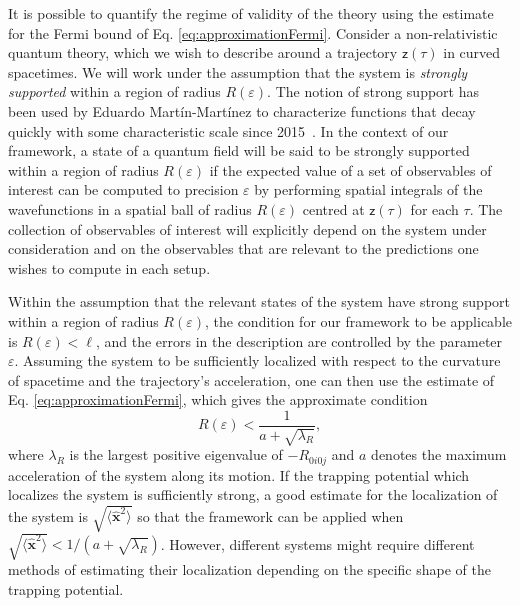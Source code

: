 \documentclass[letterpaper,12pt,titlepage,oneside,final]{book}
\newcommand{\mf}{\mathsf}%
\begin{document}
It is possible to quantify the regime of validity of the theory using the estimate for the Fermi bound of Eq. \eqref{eq:approximationFermi}. Consider a non-relativistic quantum theory, which we wish to describe around a trajectory $\mf z(\tau)$ in curved spacetimes. We will work under the assumption that the system is \emph{strongly supported} within a region of radius $R(\varepsilon)$. The notion of strong support has been used by Eduardo Mart\'in-Mart\'inez to characterize functions that decay quickly with some characteristic scale since 2015~\cite{Pozas-Kerstjens:2015}. In the context of our framework, a state of a quantum field will be said to be strongly supported within a region of radius $R(\varepsilon)$ if the expected value of a set of observables of interest can be computed to precision $\varepsilon$ by performing spatial integrals of the wavefunctions in a spatial ball of radius $R(\varepsilon)$ centred at $\mf z(\tau)$ for each $\tau$. The collection of observables of interest will explicitly depend on the system under consideration and on the observables that are relevant to the predictions one wishes to compute in each setup.

Within the assumption that the relevant states of the system have strong support within a region of radius $R(\varepsilon)$, the condition for our framework to be applicable is $R(\varepsilon)<\ell$, and the errors in the description are controlled by the parameter $\varepsilon$. Assuming the system to be sufficiently localized with respect to the curvature of spacetime and the trajectory's acceleration, one can then use the estimate of Eq. \eqref{eq:approximationFermi}, which gives the approximate condition
\begin{equation}
    R(\varepsilon)<\frac{1}{a + \sqrt{\lambda_R}},
\end{equation}
where $\lambda_R$ is the largest positive eigenvalue of $-R_{0i0j}$ and $a$ denotes the maximum acceleration of the system along its motion. If the trapping potential which localizes the system is sufficiently strong, a good estimate for the localization of the system is $\sqrt{\langle\hat{\bm x}^2\rangle}$ so that the framework can be applied when $\sqrt{\langle\hat{\bm x}^2\rangle}<1/(a+\sqrt{\lambda_R})$. However, different systems might require different methods of estimating their localization depending on the specific shape of the trapping potential.
\end{document}
